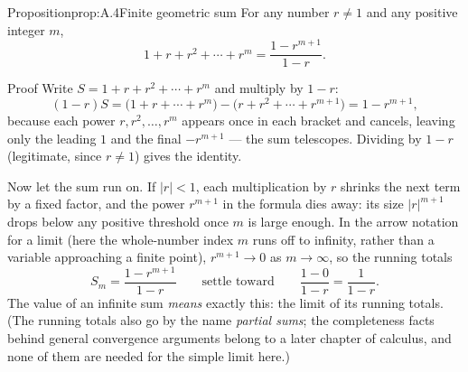 \documentclass[a4paper,12pt,oneside]{memoir}
\begin{document}
\begin{envproposition}{Proposition}{prop:A.4}{Finite geometric sum}
For any number \(r \neq 1\) and any positive integer \(m\), \[ 1 + r + r^{2} + \cdots + r^{m} = \frac{1 - r^{m+1}}{1 - r}. \]
\end{envproposition}
\begin{envproof}{Proof}{}{}
Write \(S = 1 + r + r^{2} + \cdots + r^{m}\) and multiply by \(1 - r\): \[ (1 - r)S = \bigl(1 + r + \cdots + r^{m}\bigr) - \bigl(r + r^{2} + \cdots + r^{m+1}\bigr) = 1 - r^{m+1}, \] because each power \(r, r^{2}, \ldots, r^{m}\) appears once in each bracket and cancels, leaving only the leading \(1\) and the final \(-r^{m+1}\) — the sum telescopes. Dividing by \(1 - r\) (legitimate, since \(r \neq 1\)) gives the identity. \qedmark
\end{envproof}
Now let the sum run on. If \(\lvert r \rvert < 1\), each multiplication by \(r\) shrinks the next term by a fixed factor, and the power \(r^{m+1}\) in the formula dies away: its size \(\lvert r \rvert^{m+1}\) drops below any positive threshold once \(m\) is large enough. In the arrow notation for a limit (here the whole-number index \(m\) runs off to infinity, rather than a variable approaching a finite point), \(r^{m+1} \to 0\) as \(m \to \infty\), so the running totals \[ S_{m} = \frac{1 - r^{m+1}}{1 - r} \qquad\text{settle toward}\qquad \frac{1 - 0}{1 - r} = \frac{1}{1 - r}. \] The value of an infinite sum \emph{means} exactly this: the limit of its running totals. (The running totals also go by the name \emph{partial sums}; the completeness facts behind general convergence arguments belong to a later chapter of calculus, and none of them are needed for the simple limit here.)
\end{document}
